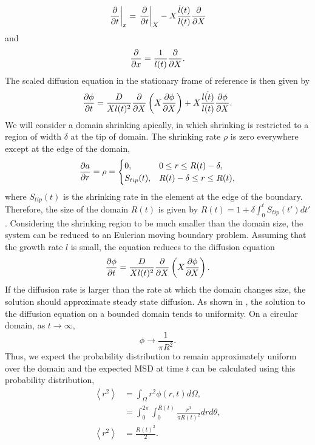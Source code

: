 %
\begin{equation}
\left.\frac{\partial }{\partial t}\right|_{x} = \left.\frac{\partial }{\partial t}\right|_{X} - X \frac{\dot{l}(t)}{l(t)} \frac{\partial }{\partial X}
\end{equation}
%
and
%
\begin{equation}
\frac{\partial }{\partial x} = \frac{1}{l(t)}\frac{\partial }{\partial X}.
\end{equation}
%
The scaled diffusion equation in the stationary frame of reference is then given by
%
\begin{equation}
\frac{\partial \phi}{\partial t} = \frac{D}{Xl(t)^2}\frac{\partial }{\partial X}\left(X \frac{\partial \phi}{\partial X} \right) + X \frac{\dot{l(t)}}{l(t)}\frac{\partial \phi}{\partial X}.
\end{equation}
%
We will consider a domain shrinking apically, in which shrinking is restricted to a region of width $\delta$ at the tip of domain. The shrinking rate $\rho$ is zero everywhere except at the edge of the domain,
%
\begin{equation}
\frac{\partial a}{\partial r} = \rho = \begin{cases}
		0, & 0 \leq r \leq R(t) - \delta, \\
		S_{tip}(t), & R(t) - \delta \leq r \leq R(t), \\
		\end{cases}
\end{equation}
%
where $S_{tip}(t)$ is the shrinking rate in the element at the edge of the boundary. Therefore, the size of the domain $R(t)$ is given by $R(t) = 1 + \delta \int_0^t S_{tip}(t')dt'$. Considering the shrinking region to be much smaller than the domain size, the system can be reduced to an Eulerian moving boundary problem.
Assuming that the growth rate $l$ is small, the equation reduces to the diffusion equation
%
\begin{equation}
\frac{\partial \phi}{\partial t} = \frac{D}{Xl(t)^2}\frac{\partial }{\partial X}\left(X \frac{\partial \phi}{\partial X} \right).
\end{equation}
%
If the diffusion rate is larger than the rate at which
 the domain changes size, the solution should approximate steady state diffusion. As shown in , the solution to the diffusion equation on a bounded domain tends to uniformity. On a circular domain, as $t\rightarrow \infty$,
  \begin{equation}
  \phi \rightarrow \frac{1}{\pi R^2}.
  \label{eqn:uniform_circle}
  \end{equation}
Thus, we expect the probability distribution to remain
 approximately uniform over the domain and the expected MSD at time $t$ can be calculated using this probability distribution,
 \begin{align}
 \left<r^2\right> 	&= \int_{\Omega}r^2 \phi(r,t) d\Omega , \nonumber\\
                 	&= \int_0^{2\pi}\int_0^{R(t)} \frac{r^3}{\pi R(t)^2} dr d\theta, \nonumber \\
 \left<r^2\right>	&= \frac{R(t)^2}{2} .
 \label{eqn:shrink_domain}
 \end{align}
